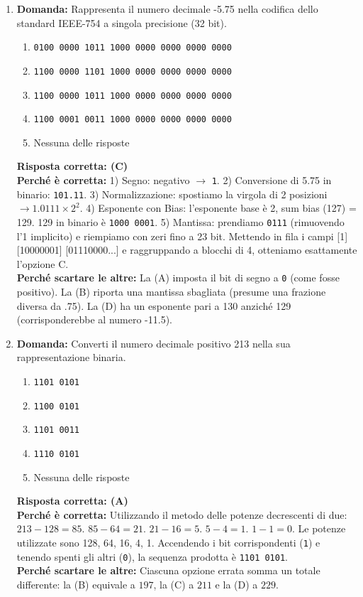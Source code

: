 \documentclass[12pt, a4paper]{article}
\begin{document}
\begin{enumerate}
    \item \textbf{Domanda:} Rappresenta il numero decimale -5.75 nella codifica dello standard IEEE-754 a singola precisione (32 bit).
    \begin{enumerate}[label=(\Alph*)]
        \item \texttt{0100 0000 1011 1000 0000 0000 0000 0000}
        \item \texttt{1100 0000 1101 1000 0000 0000 0000 0000}
        \item \texttt{1100 0000 1011 1000 0000 0000 0000 0000}
        \item \texttt{1100 0001 0011 1000 0000 0000 0000 0000}
        \item Nessuna delle risposte
    \end{enumerate}
    \textbf{Risposta corretta: (C)} \\
    \textbf{Perché è corretta:} 1) Segno: negativo $\rightarrow$ \texttt{1}. 2) Conversione di 5.75 in binario: \texttt{101.11}. 3) Normalizzazione: spostiamo la virgola di 2 posizioni $\rightarrow 1.0111 \times 2^2$. 4) Esponente con Bias: l'esponente base è 2, sum bias (127) = 129. 129 in binario è \texttt{1000 0001}. 5) Mantissa: prendiamo \texttt{0111} (rimuovendo l'1 implicito) e riempiamo con zeri fino a 23 bit. Mettendo in fila i campi [1] [10000001] [01110000...] e raggruppando a blocchi di 4, otteniamo esattamente l'opzione C. \\
    \textbf{Perché scartare le altre:} La (A) imposta il bit di segno a \texttt{0} (come fosse positivo). La (B) riporta una mantissa sbagliata (presume una frazione diversa da .75). La (D) ha un esponente pari a 130 anziché 129 (corrisponderebbe al numero -11.5).

    \item \textbf{Domanda:} Converti il numero decimale positivo 213 nella sua rappresentazione binaria.
    \begin{enumerate}[label=(\Alph*)]
        \item \texttt{1101 0101}
        \item \texttt{1100 0101}
        \item \texttt{1101 0011}
        \item \texttt{1110 0101}
        \item Nessuna delle risposte
    \end{enumerate}
    \textbf{Risposta corretta: (A)} \\
    \textbf{Perché è corretta:} Utilizzando il metodo delle potenze decrescenti di due: $213 - 128 = 85$. $85 - 64 = 21$. $21 - 16 = 5$. $5 - 4 = 1$. $1 - 1 = 0$. Le potenze utilizzate sono 128, 64, 16, 4, 1. Accendendo i bit corrispondenti (\texttt{1}) e tenendo spenti gli altri (\texttt{0}), la sequenza prodotta è \texttt{1101 0101}. \\
    \textbf{Perché scartare le altre:} Ciascuna opzione errata somma un totale differente: la (B) equivale a $197$, la (C) a $211$ e la (D) a $229$.


\end{enumerate}
\end{document}
